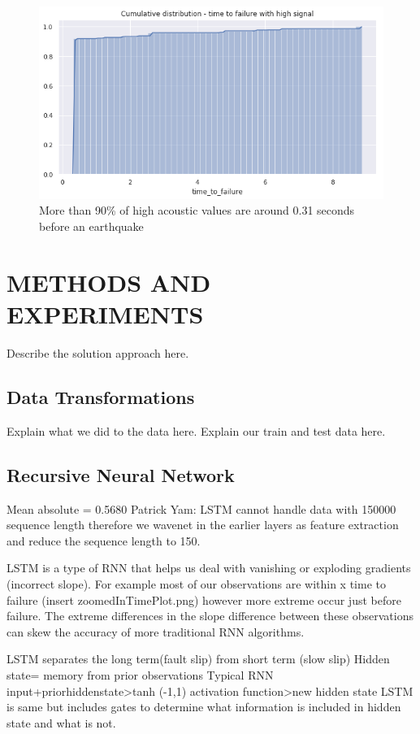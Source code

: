 \documentclass[]{llncs}
\begin{document}
\begin{figure}
	\centering
	\includegraphics[width=0.7\linewidth]{../GPUProject/moreThan90percent}
	\caption{More than 90\% of high acoustic values are around 0.31 seconds before an earthquake}
		\label{fig:morethan90percent}
	\end{figure}






\section{METHODS AND EXPERIMENTS}
Describe the solution approach here.
\subsection{Data Transformations}
Explain what we did to the data here.
Explain our train and test data here.

\subsection{Recursive Neural Network}
Mean absolute = 0.5680
Patrick Yam: LSTM cannot handle data with 150000 sequence length therefore we wavenet in the earlier layers as feature extraction and reduce the sequence length to 150.\par

LSTM is a type of RNN that helps us deal with vanishing or exploding gradients (incorrect slope). For example most of our observations are within x time to failure (insert zoomedInTimePlot.png) however more extreme occur just before failure. The extreme differences in the slope difference between these observations can skew the accuracy of more traditional RNN algorithms.

LSTM separates the long term(fault slip) from short term (slow slip)
Hidden state= memory from prior observations
Typical RNN input+priorhiddenstate>tanh (-1,1) activation function>new hidden state
LSTM is same but includes gates to determine what information is included in hidden state and what is not.
\end{document}
